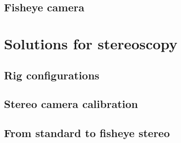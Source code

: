 \subsection{Fisheye camera}


\section{Solutions for stereoscopy}

\subsection{Rig configurations}

\subsection{Stereo camera calibration}

\subsection{From standard to fisheye stereo}



